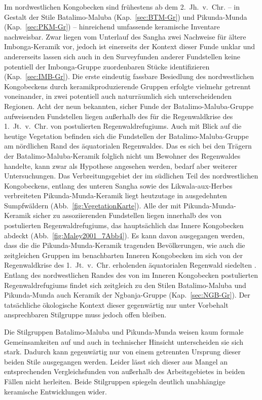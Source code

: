 Im nordwestlichen Kongobecken sind frühestens ab dem 2.~Jh.~v.~Chr. -- in Gestalt der Stile Batalimo-Maluba (Kap.~\ref{sec:BTM-Gr}) und Pikunda-Munda (Kap.~\ref{sec:PKM-Gr}) -- hinreichend umfassende keramische Inventare nachweisbar. Zwar liegen vom Unterlauf des Sangha zwei Nachweise für ältere Imbonga-Keramik vor, jedoch ist einerseits der Kontext dieser Funde unklar und andererseits lassen sich auch in den Surveyfunden anderer Fundstellen keine potentiell der Imbonga-Gruppe zuordenbaren Stücke identifizieren (Kap.~\ref{sec:IMB-Gr}). Die erste eindeutig fassbare Besiedlung des nordwestlichen Kongobeckens durch keramikproduzierende Gruppen erfolgte vielmehr getrennt voneinander, in zwei potentiell auch naturräumlich sich unterscheidenden Regionen. Acht der neun bekannten, sicher Funde der Batalimo-Maluba-Gruppe aufweisenden Fundstellen liegen außerhalb des für die Regenwaldkrise des 1.~Jt.~v.~Chr. von \textcite[7 Abb.~4; Abb.~\ref{fig:Maley2001_7Abb4}]{Maley.2001} postulierten Regenwaldrefugiums. Auch mit Blick auf die heutige Vegetation befinden sich die Fundstellen der Batalimo-Maluba-Gruppe am nördlichen Rand des äquatorialen Regenwaldes. Das es sich bei den Trägern der Batalimo-Maluba-Keramik folglich nicht um Bewohner des Regenwaldes handelte, kann zwar als Hypothese angesehen werden, bedarf aber weiterer Untersuchungen. Das Verbreitungsgebiet der im südlichen Teil des nordwestlichen Kongobeckens, entlang des unteren Sangha sowie des Likwala-aux-Herbes verbreiteten Pikunda-Munda-Keramik liegt heutzutage in ausgedehnten Sumpfwäldern (Abb.~\ref{fig:VegetationKarte}). Alle der mit Pikunda-Munda-Keramik sicher zu assoziierenden Fundstellen liegen innerhalb des von \textcite{Maley.2001} postulierten Regenwaldrefugiums, das hauptsächlich das Innere Kongobecken abdeckt (Abb.~\ref{fig:Maley2001_7Abb4}). Es kann davon ausgegangen werden, dass die die Pikunda-Munda-Keramik tragenden Bevölkerungen, wie auch die zeitgleichen Gruppen im benachbarten Inneren Kongobecken im sich von der Regenwaldkrise des 1.~Jt.~v.~Chr. erholenden äquatorialen Regenwald siedelten \parencite[siehe][337]{Hubau.2013}. Entlang des nordwestlichen Randes des von \textcite{Maley.2001} im Inneren Kongobecken postulierten Regenwaldrefugiums findet sich zeitgleich zu den Stilen Batalimo-Maluba und Pikunda-Munda auch Keramik der Ngbanja-Gruppe (Kap.~\ref{sec:NGB-Gr}). Der tatsächliche ökologische Kontext dieser gegenwärtig nur unter Vorbehalt ansprechbaren Stilgruppe muss jedoch offen bleiben. 

Die Stilgruppen Batalimo-Maluba und Pikunda-Munda weisen kaum formale Gemeinsamkeiten auf und auch in technischer Hinsicht unterscheiden sie sich stark. Dadurch kann gegenwärtig nur von einem getrennten Ursprung dieser beiden Stile ausgegangen werden. Leider lässt sich dieser aus Mangel an entsprechenden Vergleichsfunden von außerhalb des Arbeitsgebietes in beiden Fällen nicht herleiten. Beide Stilgruppen spiegeln deutlich unabhängige keramische Entwicklungen wider.

